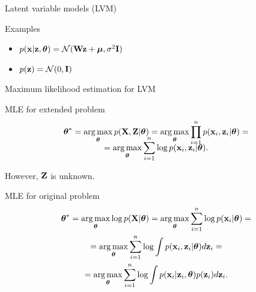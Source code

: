 \begin{frame}{Latent variable models (LVM)}
\begin{block}{Examples}
\begin{minipage}[t]{0.53\columnwidth}
\begin{figure}
			\end{figure}
			\vspace{-0.3cm}
			\begin{itemize}
				\item $p(\mathbf{x} | \mathbf{z}, \boldsymbol{\theta}) = \mathcal{N}(\mathbf{W} \mathbf{z} + \boldsymbol{\mu}, \sigma^2 \mathbf{I})$
				\item $p(\mathbf{z}) = \mathcal{N}(0, \mathbf{I})$
			\end{itemize}
		\end{minipage}
	\end{block}
\end{frame}
\begin{frame}{Maximum likelihood estimation for LVM}
	\begin{block}{MLE for extended problem}
		\vspace{-0.7cm}
		\begin{multline*}
			\vspace{-0.5cm}
			\btheta^* = \argmax_{\btheta} p(\bX, \bZ | \btheta) = \argmax_{\btheta} \prod_{i=1}^n p(\bx_i, \bz_i | \btheta) = \\ = \argmax_{\btheta} \sum_{i=1}^n \log p(\bx_i, \bz_i | \btheta).
		\end{multline*}
		\vspace{-0.5cm}
	\end{block}
	However, $\mathbf{Z}$ is unknown.
	\begin{block}{MLE for original problem}
		\vspace{-0.7cm}
		\begin{multline*}
			\boldsymbol{\theta}^* = \operatorname*{arg\,max}_{\boldsymbol{\theta}} \log p(\mathbf{X}| \boldsymbol{\theta}) = \operatorname*{arg\,max}_{\boldsymbol{\theta}} \sum_{i=1}^n \log p(\mathbf{x}_i | \boldsymbol{\theta}) = \\ =  \operatorname*{arg\,max}_{\boldsymbol{\theta}}  \sum_{i=1}^n \log \int p(\mathbf{x}_i, \mathbf{z}_i | \boldsymbol{\theta}) d \mathbf{z}_i = \\ = \operatorname*{arg\,max}_{\boldsymbol{\theta}} \sum_{i=1}^n \log \int p(\mathbf{x}_i| \mathbf{z}_i, \boldsymbol{\theta}) p(\mathbf{z}_i) d\mathbf{z}_i.
		\end{multline*}
	\end{block}
	
\end{frame}
